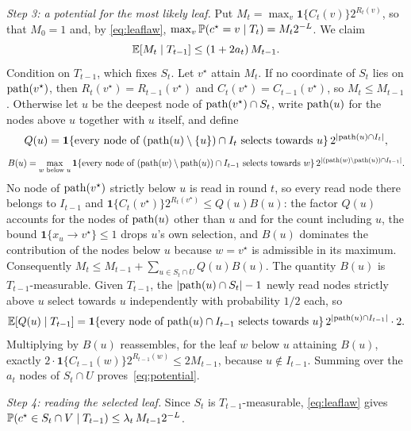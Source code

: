 \emph{Step 3: a potential for the most likely leaf.}
Put $M_t=\max_v\mathbf 1\{C_t(v)\}2^{R_t(v)}$, so that $M_0=1$ and, by
\eqref{eq:leaflaw}, $\max_v\mathbb P(c^\star=v\mid T_t)=M_t2^{-L}$. We claim
\begin{equation}
 \mathbb{E}[M_t\mid T_{t-1}]\le(1+2a_t)\,M_{t-1}.\label{eq:potential}
\end{equation}
Condition on $T_{t-1}$, which fixes $S_t$. Let $v^\star$ attain $M_t$. If no
coordinate of $S_t$ lies on ${\rm path}(v^\star)$, then
$R_t(v^\star)=R_{t-1}(v^\star)$ and $C_t(v^\star)=C_{t-1}(v^\star)$, so
$M_t\le M_{t-1}$. Otherwise let $u$ be the deepest node of
${\rm path}(v^\star)\cap S_t$, write ${\rm path}(u)$ for the nodes above $u$
together with $u$ itself, and define
\[
 Q(u)=\mathbf 1\{\text{every node of }({\rm path}(u)\setminus\{u\})\cap I_t\text{ selects towards }u\}\,2^{|{\rm path}(u)\cap I_t|},
\]
\[
 B(u)=\max_{w\text{ below }u}\mathbf 1\{\text{every node of }({\rm path}(w)\setminus{\rm path}(u))\cap I_{t-1}\text{ selects towards }w\}\,2^{|({\rm path}(w)\setminus{\rm path}(u))\cap I_{t-1}|}.
\]
No node of ${\rm path}(v^\star)$ strictly below $u$ is read in round $t$, so
every read node there belongs to $I_{t-1}$ and
$\mathbf 1\{C_t(v^\star)\}2^{R_t(v^\star)}\le Q(u)B(u)$: the
factor $Q(u)$ accounts for the nodes of ${\rm path}(u)$ other than $u$ and for
the count including $u$, the bound $\mathbf 1\{x_u\to v^\star\}\le1$ drops
$u$'s own selection, and $B(u)$ dominates the contribution of the nodes below
$u$ because $w=v^\star$ is admissible in its maximum. Consequently
$M_t\le M_{t-1}+\sum_{u\in S_t\cap U}Q(u)B(u)$. The quantity $B(u)$ is
$T_{t-1}$-measurable. Given $T_{t-1}$, the $|{\rm path}(u)\cap S_t|-1$ newly
read nodes strictly above $u$ select towards $u$ independently with
probability $1/2$ each, so
\[
 \mathbb{E}[Q(u)\mid T_{t-1}]
 =\mathbf 1\{\text{every node of }{\rm path}(u)\cap I_{t-1}\text{ selects towards }u\}\,
   2^{|{\rm path}(u)\cap I_{t-1}|}\cdot2 .
\]
Multiplying by $B(u)$ reassembles, for the leaf $w$ below $u$ attaining
$B(u)$, exactly $2\cdot\mathbf 1\{C_{t-1}(w)\}2^{R_{t-1}(w)}\le2M_{t-1}$, because
$u\notin I_{t-1}$. Summing over the $a_t$ nodes of $S_t\cap U$
proves~\eqref{eq:potential}.

\emph{Step 4: reading the selected leaf.}
Since $S_t$ is $T_{t-1}$-measurable, \eqref{eq:leaflaw} gives
$\mathbb P(c^\star\in S_t\cap V\mid T_{t-1})\le\lambda_t\,M_{t-1}2^{-L}$.

